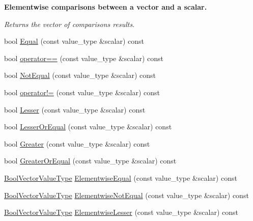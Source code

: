 \begin{Indent}{\bf Elementwise comparisons between a vector and a scalar.}\par
{\em Returns the vector of comparison\textquotesingle{}s results. }\begin{DoxyCompactItemize}
\item 
bool \hyperlink{classvct_fixed_size_const_vector_base_a3f17febef880688b00147208cdd1eb15}{Equal} (const value\+\_\+type \&scalar) const 
\item 
bool \hyperlink{classvct_fixed_size_const_vector_base_a3dc305977c625937fd0809ae2b171d8c}{operator==} (const value\+\_\+type \&scalar) const 
\item 
bool \hyperlink{classvct_fixed_size_const_vector_base_ab33e5ab35918ea803a5c94f3f9ee7a9e}{Not\+Equal} (const value\+\_\+type \&scalar) const 
\item 
bool \hyperlink{classvct_fixed_size_const_vector_base_a22f3b10fd91364fa701b9a775436fb89}{operator!=} (const value\+\_\+type \&scalar) const 
\item 
bool \hyperlink{classvct_fixed_size_const_vector_base_ac047078e830c5fbe4fcfa01b6930026d}{Lesser} (const value\+\_\+type \&scalar) const 
\item 
bool \hyperlink{classvct_fixed_size_const_vector_base_a992df32d08f73a6c97f0ff49796fd940}{Lesser\+Or\+Equal} (const value\+\_\+type \&scalar) const 
\item 
bool \hyperlink{classvct_fixed_size_const_vector_base_aa08707e079adf289afb2a381baee6878}{Greater} (const value\+\_\+type \&scalar) const 
\item 
bool \hyperlink{classvct_fixed_size_const_vector_base_a59ac073f92ab479bb1292ff336b9dcdb}{Greater\+Or\+Equal} (const value\+\_\+type \&scalar) const 
\item 
\hyperlink{classvct_fixed_size_const_vector_base_a15899465a75a2f78965bdcf2d6e34bc5}{Bool\+Vector\+Value\+Type} \hyperlink{classvct_fixed_size_const_vector_base_a0e410fd6fc061481880f6052f6af3aa0}{Elementwise\+Equal} (const value\+\_\+type \&scalar) const 
\item 
\hyperlink{classvct_fixed_size_const_vector_base_a15899465a75a2f78965bdcf2d6e34bc5}{Bool\+Vector\+Value\+Type} \hyperlink{classvct_fixed_size_const_vector_base_ab00e79ffdc3b73f4c13732d2b195a8e3}{Elementwise\+Not\+Equal} (const value\+\_\+type \&scalar) const 
\item 
\hyperlink{classvct_fixed_size_const_vector_base_a15899465a75a2f78965bdcf2d6e34bc5}{Bool\+Vector\+Value\+Type} \hyperlink{classvct_fixed_size_const_vector_base_a822a3c606a54eff1d9817c61b096e51f}{Elementwise\+Lesser} (const value\+\_\+type \&scalar) const 

\end{DoxyCompactItemize}
\end{Indent}
